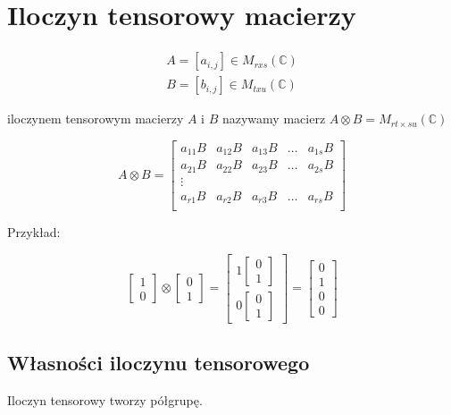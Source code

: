 \documentclass{article}
\newcommand\CC{\mathbb{C}}
\begin{document}
\section{Iloczyn tensorowy macierzy}

$$
\begin{aligned}
A = [ a_{i,j} ] \in M_{r x s}(\CC) \\
B = [ b_{i,j} ] \in M_{t x u}(\CC)
\end{aligned}
$$

iloczynem tensorowym macierzy $A$ i $B$ nazywamy macierz $ A \otimes B = M_{rt \times su}(\CC) $


$$
A \otimes B = \begin{bmatrix}
	a_{11} B & a_{12} B & a_{13} B & \dots & a_{1s} B \\
	a_{21} B & a_{22} B & a_{23} B & \dots & a_{2s} B \\
	\vdots   &                                      \\
	a_{r1} B & a_{r2} B & a_{r3} B & \dots & a_{rs} B \\
\end{bmatrix}
$$

Przykład:

$$
\begin{bmatrix}1 \\ 0\end{bmatrix} \otimes \begin{bmatrix}0 \\ 1\end{bmatrix} =
	\begin{bmatrix}1 \begin{bmatrix} 0 \\ 1 \end{bmatrix} \\ 0 \begin{bmatrix} 0 \\ 1 \end{bmatrix} \end{bmatrix} = \begin{bmatrix} 0 \\ 1 \\ 0 \\ 0 \end{bmatrix}
$$

\subsection{Własności iloczynu tensorowego}

Iloczyn tensorowy tworzy półgrupę.
\end{document}
